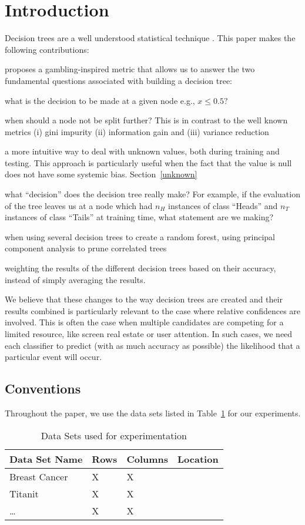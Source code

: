 
\section{Introduction}

Decision trees are a well understood statistical technique \cite{Hastie2009}.
This paper makes the following contributions:
\be
\item proposes a gambling-inspired metric that allows us to answer
the two fundamental questions associated with building a decision tree:
\be
\item what is the decision to be made at a given node e.g., \(x \leq 0.5?\)
\item when should a node not be split further?
\ee
This is in contrast to the well known metrics (i) gini impurity (ii) information
gain and (iii) variance reduction
\item a more intuitive way to deal with unknown values, both during 
training and testing. This approach is particularly useful when
the fact that the value is null does not have some systemic bias.
Section~\ref{unknown}
\item what ``decision'' does the decision tree really make? For example, if the
evaluation of the tree leaves us at a node which had 
\(n_H\) instances of class ``Heads'' and 
\(n_T\) instances of class ``Tails'' at training time, what statement are we
making?
\item when using several decision trees to create a random forest, using
principal component analysis to prune correlated trees
\item weighting the results of the different decision trees based 
on their accuracy, instead of simply averaging the results.
\ee

We believe that these changes to the way decision trees are created and their
results combined is particularly relevant to the case where relative
confidences are involved. This is often the case when multiple candidates are
competing for a limited resource, like screen real estate or user attention. In
such cases, we need each classifier to predict (with as much accuracy as
possible) the likelihood that a particular event will occur.

\subsection{Conventions}
Throughout the paper, we use the data sets listed in Table~\ref{tbl_data_sets}
for our experiments. 
\begin{table}
\centering
\begin{tabular}{|l|l|l|l|} \hline \hline
{\bf Data Set Name } & {\bf Rows} & {\bf Columns} & {\bf Location} \\ \hline 
Breast Cancer & X & X & \\ \hline
Titanit & X & X & \\ \hline
\ldots & X & X & \\ \hline
\end{tabular}
\label{tbl_data_sets}
\caption{Data Sets used for experimentation}
\end{table}

